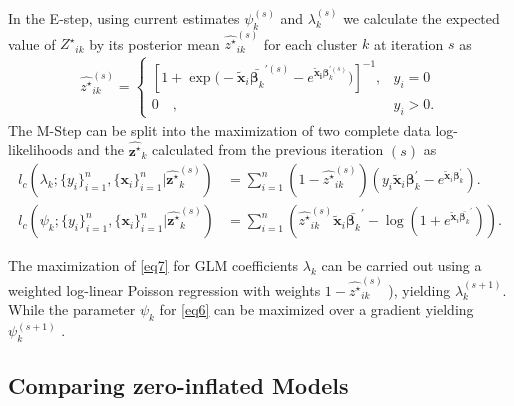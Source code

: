 \documentclass[12pt,letterpaper]{article}
\numberwithin{equation}{section}
\numberwithin{equation}{section}
\numberwithin{equation}{section}
\newcommand{\xTilda}{\tilde{\bm{x}}}
\newcommand{\zZ}{Z^\star}
\newcommand{\zz}{z^\star}
\begin{document}

In the E-step, using current estimates $\psi_k^{(s)}$ and $ \lambda_k^{(s)} $ %
we calculate the expected value of ${{\zZ}_{ik}}$ by its posterior mean ${\hat{\zz}_{ik}^{(s)}}$ for each cluster $k$ at iteration $s$ as
\begin{align*}
{\hat{\zz}}_{ik}^{(s)} = \begin{cases}  \left[ 1 + \exp{\big(-\xTilda_i \bar{\bm{\beta}_k}^{'(s)} - e^ {\bm{\xTilda_i} \bm{\beta}_k^{'(s)}} \big) } \right]^{-1}, &  y_{i} = 0 \\
  0 \quad , & y_{i}> 0 .
\end{cases}
\end{align*}
%
The M-Step can be split into the maximization of two complete data log-likelihoods and the $\hat{\bm{\zz}}_k$ calculated from the previous iteration $(s)$ as
\begin{align}
 l_c(\lambda_k; \{y_i\}_{i=1}^n,\{\bm{x}_i\}_{i=1}^n| \hat{\bm{\zz}}_k^{(s)}) &= \sum_{i=1}^n (1- \hat{\zz}_{ik}^{(s)}) (y_i \xTilda_i \bm{\beta}_k^{'}  - e^{\xTilda_i \bm{\beta}_k^{'}})\label{eq7}.\\
l_c(\psi_k;\{y_i\}_{i=1}^n,\{\bm{x}_i\}_{i=1}^n|\hat{\bm{\zz}}_k^{(s)}) &=\sum_{i=1}^n \left( \hat{\zz}_{ik}^{(s)} \xTilda_i \bar{\bm{\beta}_k }^{'} - \log \left(1+ e^{ \xTilda_i \bar{\bm{\beta}_k }^{'}} \right) \right). \label{eq6}   
 \end{align}

The maximization of \eqref{eq7} for GLM coefficients $\lambda_k$ can be carried out using a weighted log-linear Poisson regression with weights $1 - \hat{\zz}_{ik}^{(s)}$ \citep[see][]{McCullaghNelder1989}), yielding $\lambda_k^{(s+1)}$.
While the parameter $\psi_k$ for \eqref{eq6} can be maximized over a gradient yielding $\psi_k^{(s+1)}$ \citep[see][]{Lambert}. 

\subsection{Comparing zero-inflated Models}\label{subsec:: compareZero}
\end{document}

